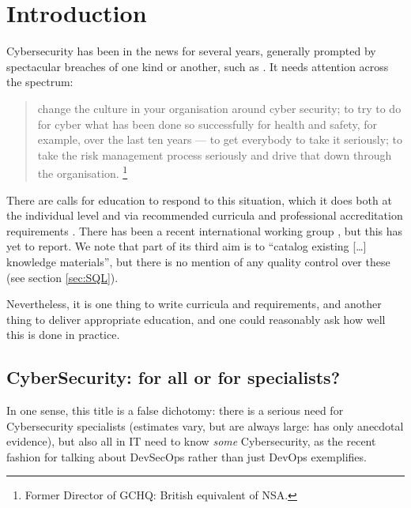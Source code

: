 \documentclass[conference]{IEEEtran}
\begin{document}
\section{Introduction}

Cybersecurity has been in the news for several years, generally prompted by spectacular breaches of one kind or another, such as \cite{BritishAirways2018a}.
It needs attention across the spectrum:
\begin{quote}
change the culture in your organisation around cyber security; to try to do for cyber what has been done so successfully for health and safety, for example, over the last ten years --- to get everybody to take it seriously; to take the risk management process seriously and drive that down through the organisation. \cite{Hannigan2019a}\footnote{Former Director of GCHQ: British equivalent of NSA.}
\end{quote}

There are calls for education to respond to this situation, which it does both at the individual level and via recommended curricula \cite{ACM2013a} and professional accreditation requirements \cite{BCS2018a}. There has been a recent international working group \cite{Parrishetal2018a}, but this has yet to report.  We note that part of its third aim is to ``catalog existing [\dots] knowledge materials'', but there is no mention of any quality control over these (see section \ref{sec:SQL}).

Nevertheless, it is one thing to write curricula and requirements, and
another thing to deliver appropriate education, and one could
reasonably ask how well this is done in practice.
\subsection{CyberSecurity: for all or for specialists?}
In one sense, this title is a false dichotomy: there is a serious need for Cybersecurity specialists (estimates vary, but are always large: \cite{JCNSS2018a} has only anecdotal evidence), but also all in IT need to know \emph{some} Cybersecurity, as the recent fashion for talking about DevSecOps rather than just DevOps exemplifies.
\end{document}
